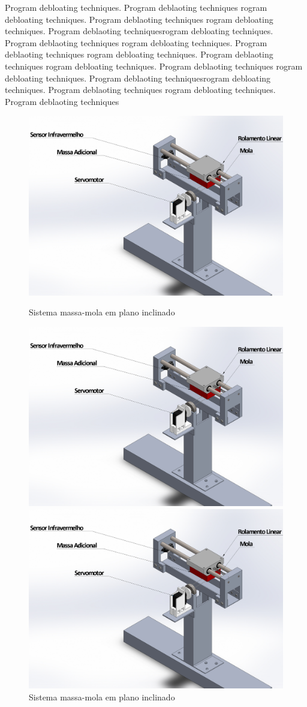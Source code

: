 \documentclass{relatorio}
\begin{document}
	Program debloating techniques. Program deblaoting techniques rogram debloating techniques. Program deblaoting techniques
	rogram debloating techniques. Program deblaoting techniquesrogram debloating techniques. Program deblaoting techniques
	rogram debloating techniques. Program deblaoting techniques rogram debloating techniques. Program deblaoting techniques
	rogram debloating techniques. Program deblaoting techniques 
	rogram debloating techniques. Program deblaoting techniquesrogram debloating techniques. Program deblaoting techniques
	rogram debloating techniques. Program deblaoting techniques
	\begin{figure}[H]
		\centering
		\captionsetup{justification=centering}
		\includegraphics[width=0.8\linewidth]{imgs/planta}
		\caption{Sistema massa-mola em plano inclinado}%
		\label{fig:plant}
		\centering
		\captionsetup{justification=centering}
		\includegraphics[width=0.8\linewidth]{imgs/planta}
		\caption{Sistema massa-mola em plano inclinado}%
		\label{fig:plant}
		\centering
		\captionsetup{justification=centering}
		\includegraphics[width=0.8\linewidth]{imgs/planta}

\end{figure}
\end{document}
